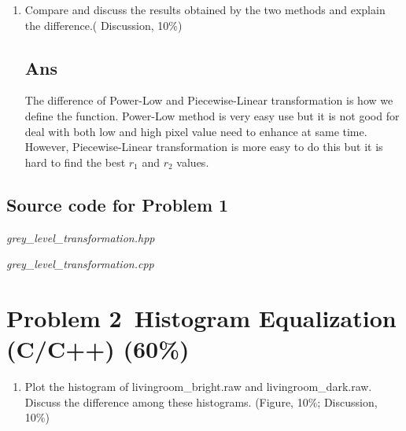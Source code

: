 \begin{reportsection}{-1cm}{-1cm}
\begin{enumerate}[label=\alph*.]
    \item 
    Compare and discuss the results obtained by the two methods and explain the 
    difference.( Discussion, 10\%)
    \subsection*{Ans}
      The difference of Power-Low and Piecewise-Linear transformation is how we define the
      function. Power-Low method is very easy use but it is not good for deal with both low and 
      high pixel value need to enhance at same time. However, Piecewise-Linear transformation
      is more easy to do this but it is hard to find the best $r_1$ and $r_2$ values.
    \end{enumerate}
    \subsection*{Source code for Problem 1}
    \textit{grey\_level\_transformation.hpp}
    
    \textit{grey\_level\_transformation.cpp}
    
    \newpage

    \section*{Problem 2~Histogram Equalization (C/C++) (60\%)}
    \begin{enumerate}[label=\alph*.]
			\item 
        Plot the histogram of livingroom\_bright.raw and livingroom\_dark.raw. 
        Discuss the difference among these histograms. (Figure, 10\%; Discussion, 10\%)

\end{enumerate}
\end{reportsection}
